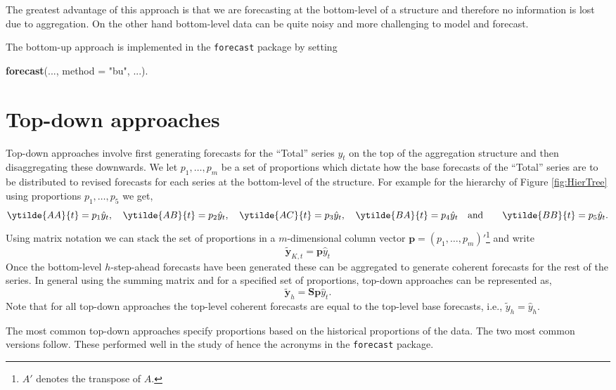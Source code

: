 \documentclass[]{book}
\newenvironment{Shaded}{\begin{snugshade}}{\end{snugshade}}
\newcommand{\DataTypeTok}[1]{\textcolor[rgb]{0.13,0.29,0.53}{#1}}
\newcommand{\KeywordTok}[1]{\textcolor[rgb]{0.13,0.29,0.53}{\textbf{#1}}}
\newcommand{\NormalTok}[1]{#1}
\newcommand{\StringTok}[1]{\textcolor[rgb]{0.31,0.60,0.02}{#1}}
\let\rmarkdownfootnote\footnote%
\def\footnote{\protect\rmarkdownfootnote}
\begin{document}
The greatest advantage of this approach is that we are forecasting at the bottom-level of a structure and therefore no information is lost due to aggregation. On the other hand bottom-level data can be quite noisy and more challenging to model and forecast.

The bottom-up approach is implemented in the \texttt{forecast} package by setting

\begin{Shaded}
\begin{Highlighting}[]
\KeywordTok{forecast}\NormalTok{(..., }\DataTypeTok{method =} \StringTok{"bu"}\NormalTok{, ...). }
\end{Highlighting}
\end{Shaded}

\hypertarget{Hier:td}{%
\section{Top-down approaches}\label{Hier:td}}

Top-down approaches involve first generating forecasts for the ``Total'' series \(y_t\) on the top of the aggregation structure and then disaggregating these downwards. We let \(p_1,\dots,p_{m}\) be a set of proportions which dictate how the base forecasts of the ``Total'' series are to be distributed to revised forecasts for each series at the bottom-level of the structure. For example for the hierarchy of Figure \ref{fig:HierTree} using proportions \(p_1,\dots,p_{5}\) we get,
\[
  \ytilde{AA}{t}=p_1\hat{y}_t,~~~\ytilde{AB}{t}=p_2\hat{y}_t,~~~\ytilde{AC}{t}=p_3\hat{y}_t,~~~\ytilde{BA}{t}=p_4\hat{y}_t~~~\text{and}~~~~~~\ytilde{BB}{t}=p_5\hat{y}_t.
\]
Using matrix notation we can stack the set of proportions in a \(m\)-dimensional column vector \(\bm{p}=(p_1,\ldots,p_{m})'\)\footnote{\(A'\) denotes the transpose of \(A\).} and write
\[\tilde{\bm{y}}_{K,t}=\bm{p}\hat{y}_t\]
Once the bottom-level \(h\)-step-ahead forecasts have been generated these can be aggregated to generate coherent forecasts for the rest of the series. In general using the summing matrix and for a specified set of proportions, top-down approaches can be represented as,
\[\tilde{\bm{y}}_h=\bm{S}\bm{p}\hat{y}_t.\]
Note that for all top-down approaches the top-level coherent forecasts are equal to the top-level base forecasts, i.e., \(\tilde{y}_{h}=\hat{y}_{h}\).

The most common top-down approaches specify proportions based on the historical proportions of the data. The two most common versions follow. These performed well in the study of \citet{GroSoh1990} hence the acronyms in the \texttt{forecast} package.
\end{document}
